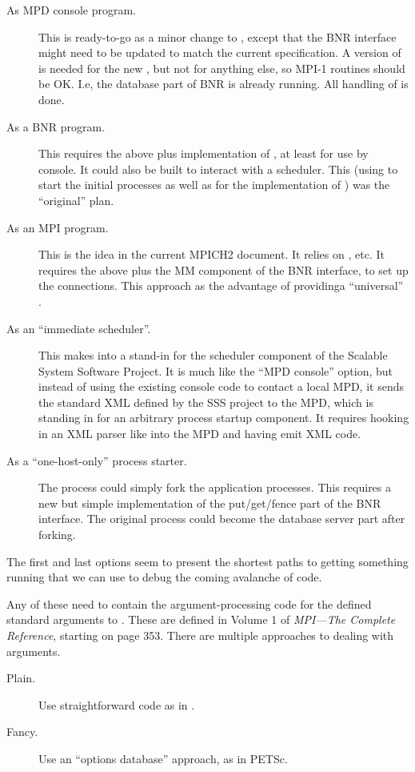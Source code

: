 \documentclass{article}
\let\file=\code
\begin{document}
\begin{description}
\item[As MPD console program.] This is ready-to-go as a minor change to
  \file{mpdcon.c}, except that the BNR interface might need to be updated to
  match 
  the current specification.  A version of  is needed for the
  new 
  , but not for anything else, so MPI-1 routines should be OK.
  I.e, 
  the database part of BNR is already running.  All handling of 
  is done.
\item[As a BNR program.] This requires the above plus implementation of
  , at least for use by console.  It could also be built to
  interact 
  with a scheduler.  This (using  to start the initial
  processes as 
  well as for the implementation of ) was the ``original''
  plan.
\item[As an MPI program.] This is the idea in the current MPICH2 document.  It
  relies on , etc.  It requires the above plus the MM
  component 
  of the BNR interface, to set up the connections.  This approach as the
  advantage of providinga ``universal'' . 
\item[As an ``immediate scheduler''.] This makes  into a stand-in
  for the scheduler component of the Scalable System Software Project.  It is
  much like the ``MPD console'' option, but instead of using the existing
  console code to contact a local MPD, it sends the standard XML defined by
  the SSS project to the MPD, which is standing in for an arbitrary process
  startup component.  It requires hooking in an XML parser like 
  into the MPD and having  emit XML code.
\item[As a ``one-host-only'' process starter.] The  process could
  simply fork the application processes.  This requires a new but simple
  implementation of the put/get/fence part of the BNR interface.  The original
   process could become the database server part after forking.
\end{description}

The first and last options seem to present the shortest paths to getting
something running that we can use to debug the coming avalanche of code.

Any of these need to contain the argument-processing code for the defined
standard arguments to .  These are defined in Volume 1 of \emph{ MPI---The Complete Reference}, starting on page 353.  There are multiple
approaches to dealing with arguments.
\begin{description}
\item[Plain.] Use straightforward code as in \file{p4_args.c}.
\item[Fancy.] Use an ``options database'' approach, as in PETSc.
\end{description}
\end{document}
